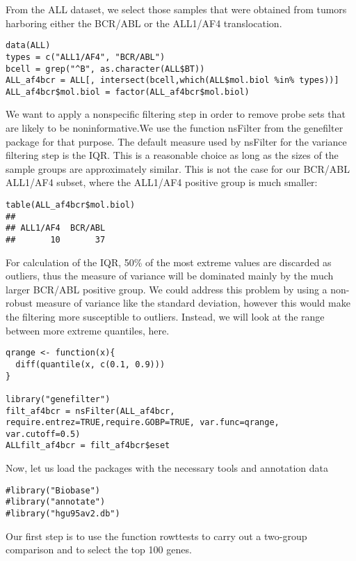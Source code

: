 From the ALL dataset, we select those samples that were obtained from
tumors harboring either the BCR/ABL or the ALL1/AF4 translocation.

\begin{verbatim}
data(ALL)
types = c("ALL1/AF4", "BCR/ABL")
bcell = grep("^B", as.character(ALL$BT))
ALL_af4bcr = ALL[, intersect(bcell,which(ALL$mol.biol %in% types))]
ALL_af4bcr$mol.biol = factor(ALL_af4bcr$mol.biol)
\end{verbatim}

We want to apply a nonspecific filtering step in order to remove probe
sets that are likely to be noninformative.We use the function nsFilter
from the genefilter package for that purpose. The default measure used
by nsFilter for the variance filtering step is the IQR. This is a
reasonable choice as long as the sizes of the sample groups are
approximately similar. This is not the case for our BCR/ABL ALL1/AF4
subset, where the ALL1/AF4 positive group is much smaller:

\begin{verbatim}
table(ALL_af4bcr$mol.biol)
## 
## ALL1/AF4  BCR/ABL 
##       10       37
\end{verbatim}

For calculation of the IQR, 50\% of the most extreme values are
discarded as outliers, thus the measure of variance will be dominated
mainly by the much larger BCR/ABL positive group. We could address this
problem by using a non-robust measure of variance like the standard
deviation, however this would make the filtering more susceptible to
outliers. Instead, we will look at the range between more extreme
quantiles, here.

\begin{verbatim}
qrange <- function(x){
  diff(quantile(x, c(0.1, 0.9)))
}

library("genefilter")
filt_af4bcr = nsFilter(ALL_af4bcr, require.entrez=TRUE,require.GOBP=TRUE, var.func=qrange, var.cutoff=0.5)
ALLfilt_af4bcr = filt_af4bcr$eset
\end{verbatim}

Now, let us load the packages with the necessary tools and annotation
data

\begin{verbatim}
#library("Biobase")
#library("annotate")
#library("hgu95av2.db")
\end{verbatim}

Our first step is to use the function rowttests to carry out a two-group
comparison and to select the top 100 genes.

